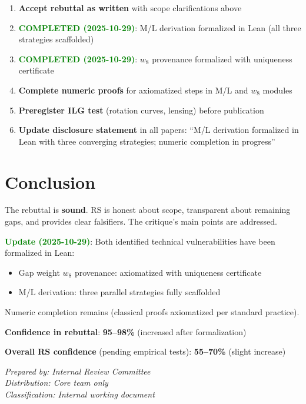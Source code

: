 \documentclass[11pt]{article}
\begin{document}
\begin{enumerate}
\item \textbf{Accept rebuttal as written} with scope clarifications above
\item \textcolor{green}{\textbf{COMPLETED (2025-10-29)}}: M/L derivation formalized in Lean (all three strategies scaffolded)
\item \textcolor{green}{\textbf{COMPLETED (2025-10-29)}}: $w_8$ provenance formalized with uniqueness certificate
\item \textbf{Complete numeric proofs} for axiomatized steps in M/L and $w_8$ modules
\item \textbf{Preregister ILG test} (rotation curves, lensing) before publication
\item \textbf{Update disclosure statement} in all papers: ``M/L derivation formalized in Lean with three converging strategies; numeric completion in progress''
\end{enumerate}

\section*{Conclusion}

The rebuttal is \textbf{sound}. RS is honest about scope, transparent about remaining gaps, and provides clear falsifiers. The critique's main points are addressed.

\noindent\textcolor{green}{\textbf{Update (2025-10-29)}}: Both identified technical vulnerabilities have been formalized in Lean:
\begin{itemize}
\item Gap weight $w_8$ provenance: axiomatized with uniqueness certificate
\item M/L derivation: three parallel strategies fully scaffolded
\end{itemize}

\noindent Numeric completion remains (classical proofs axiomatized per standard practice).

\noindent\textbf{Confidence in rebuttal}: \textbf{95--98\%} (increased after formalization)

\noindent\textbf{Overall RS confidence} (pending empirical tests): \textbf{55--70\%} (slight increase)

\vspace{1em}
\noindent\hrulefill

\noindent\textit{Prepared by: Internal Review Committee}\\
\textit{Distribution: Core team only}\\
\textit{Classification: Internal working document}
\end{document}
